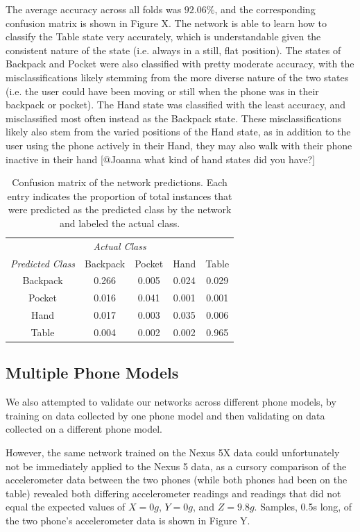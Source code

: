 The average accuracy across all folds was $92.06\%$, and the corresponding
confusion matrix is shown in Figure X. The network is able to learn how to 
classify the Table state very accurately, which is understandable given 
the consistent nature of the state (i.e. always in a still, flat position). The states
of Backpack and Pocket were also classified with pretty moderate accuracy,
with the misclassifications likely stemming from the more diverse nature of 
the two states (i.e. the user could have been moving or still when the phone was
in their backpack or pocket). The Hand state was classified with the least accuracy,
and misclassified most often instead as the Backpack state. These misclassifications
likely also stem from the varied positions of the Hand state, as in addition to the user
using the phone actively in their Hand, they may also walk with their phone inactive
in their hand [@Joanna what kind of hand states did you have?]


\begin{table}[h]
\caption{Confusion matrix of the network predictions. Each entry indicates the proportion of
total instances that were predicted as the predicted class by the network and labeled the actual class.}\label{fig:confusion} \centering
\begin{tabular}{| c || c | c | c | c }  
\toprule
\multicolumn{5}{c}{\textit{Actual Class}} \\ \cmidrule{1-5}
\textit{Predicted Class}		&	Backpack    & 	Pocket 	& 	Hand	&	Table \\
\midrule
Backpack			&	0.266 	&	0.005	&	0.024 	&	0.029 \\
Pocket			&	0.016 	&	0.041 	&	0.001 	&	0.001 \\
Hand			&	0.017 	&	0.003 	&	0.035 	&	0.006 \\
Table			&	0.004 	&	0.002 	&	0.002 	&	0.965\\
\bottomrule
\end{tabular}
\end{table}


\subsection{Multiple Phone Models}
We also attempted to validate our networks across different phone models, by training
on data collected by one phone model and then validating on data collected on a 
different phone model. 

However, the same network trained on the Nexus 5X data could unfortunately not be immediately
applied to the Nexus 5 data, as a cursory comparison of the accelerometer data between the two phones 
(while both phones had been on the table) revealed both differing accelerometer readings and readings
that did not equal the expected values of $X = 0g$, $Y = 0g$, and $Z = 9.8g$. Samples, 0.5s long, of 
the two phone's accelerometer data is shown in Figure Y. 

